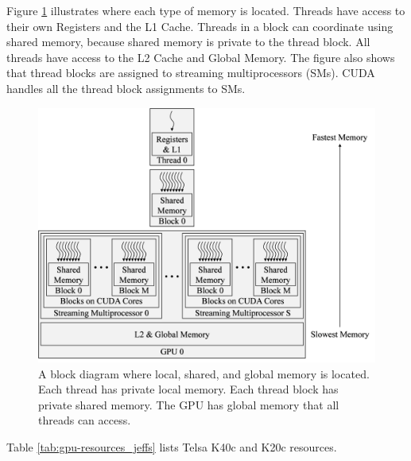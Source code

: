 Figure \ref{fig:fullGPUmemBlockDiagram} illustrates where each type of memory is located.
Threads have access to their own Registers and the L1 Cache.
Threads in a block can coordinate using shared memory, because shared memory is private to the thread block.
All threads have access to the L2 Cache and Global Memory.
The figure also shows that thread blocks are assigned to streaming multiprocessors (SMs).
CUDA handles all the thread block assignments to SMs.
\begin{figure}
	\centering\includegraphics[width=9.83in/100*55]{figures/gpu_intro/fullGPUmemBlockDiagram.pdf}
	\caption{A block diagram where local, shared, and global memory is located. Each thread has private local memory. Each thread block has private shared memory. The GPU has global memory that all threads can access.}
	\label{fig:fullGPUmemBlockDiagram}
\end{figure}
Table \ref{tab:gpu-resources_jeffs} lists Telsa K40c and K20c resources.
